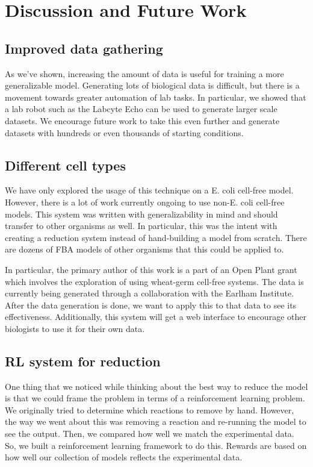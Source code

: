 \chapter{Discussion and Future Work} 

\section{Improved data gathering}
As we've shown, increasing the amount of data is useful for training a more generalizable model.
Generating lots of biological data is difficult, but there is a movement towards greater automation of lab tasks.
In particular, we showed that a lab robot such as the Labcyte Echo can be used to generate larger scale datasets.
We encourage future work to take this even further and generate datasets with hundreds or even thousands of starting conditions.

\section{Different cell types}
We have only explored the usage of this technique on a E. coli cell-free model.
However, there is a lot of work currently ongoing to use non-E. coli cell-free models.
This system was written with generalizability in mind and should transfer to other organisms as well.
In particular, this was the intent with creating a reduction system instead of hand-building a model from scratch.
There are dozens of FBA models of other organisms that this could be applied to.

In particular, the primary author of this work is a part of an Open Plant grant which involves the exploration of using wheat-germ cell-free systems.
The data is currently being generated through a collaboration with the Earlham Institute.
After the data generation is done, we want to apply this to that data to see its effectiveness.
Additionally, this system will get a web interface to encourage other biologists to use it for their own data.

\section{RL system for reduction}
One thing that we noticed while thinking about the best way to reduce the model is that we could frame the problem in terms of a reinforcement learning problem.
We originally tried to determine which reactions to remove by hand.
However, the way we went about this was removing a reaction and re-running the model to see the output.
Then, we compared how well we match the experimental data.
So, we built a reinforcement learning framework to do this.
Rewards are based on how well our collection of models reflects the experimental data.


